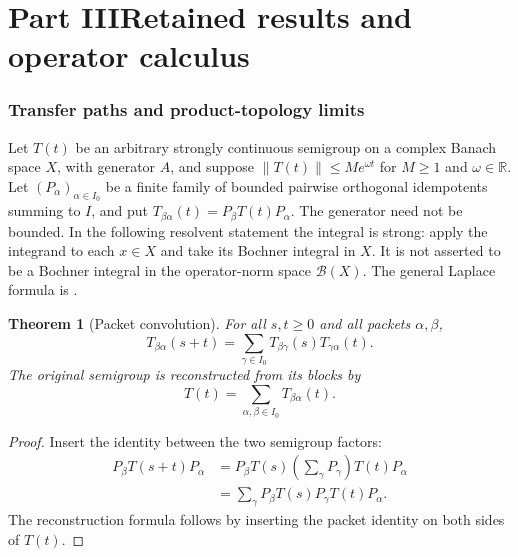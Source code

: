 \documentclass[11pt,a4paper]{article}
\newtheorem{theorem}{Theorem}[section]
\theoremstyle{definition}
\theoremstyle{remark}
\newcommand{\norm}[1]{\left\lVert#1\right\rVert}
\begin{document}
\part*{Part III\quad Retained results and operator calculus}
\setcounter{section}{0}\setcounter{figure}{0}\setcounter{table}{0}
\renewcommand{\thesection}{R\arabic{section}}
\renewcommand{\theHsection}{R.\arabic{section}}
\renewcommand{\thefigure}{R\arabic{figure}}
\renewcommand{\theHfigure}{R.\arabic{figure}}
\renewcommand{\thetable}{R\arabic{table}}
\renewcommand{\theHtable}{R.\arabic{table}}
\section{Transfer paths and product-topology limits}\label{earlier:section:01}
Let $T(t)$ be an arbitrary strongly continuous semigroup on a complex Banach space $X$, with generator $A$, and suppose $\norm{T(t)}\leq M e^{\omega t}$ for $M\geq1$ and $\omega\in\mathbb R$. Let $(P_\alpha)_{\alpha\in I_0}$ be a finite family of bounded pairwise orthogonal idempotents summing to $I$, and put $T_{\beta\alpha}(t)=P_\beta T(t)P_\alpha$. The generator need not be bounded. In the following resolvent statement the integral is strong: apply the integrand to each $x\in X$ and take its Bochner integral in $X$. It is not asserted to be a Bochner integral in the operator-norm space $\mathcal B(X)$. The general Laplace formula is \cite[Chapter II, Theorem 1.10]{EngelNagel2000}.
\begin{theorem}[Packet convolution]\label{earlier:record:001}\label{earlier:thm:packet_convolution}
For all \(s,t\geq0\) and all packets \(\alpha,\beta\),
\[
\boxed{
T_{\beta\alpha}(s+t)
=
\sum_{\gamma\in I_0}
T_{\beta\gamma}(s)T_{\gamma\alpha}(t).
}
\]
The original semigroup is reconstructed from its blocks by
\[
T(t)=\sum_{\alpha,\beta\in I_0}T_{\beta\alpha}(t).
\]
\end{theorem}

\begin{proof}
Insert the identity between the two semigroup factors:
\[
\begin{aligned}
P_\beta T(s+t)P_\alpha
&=P_\beta T(s)\left(\sum_\gamma P_\gamma\right)T(t)P_\alpha\\
&=\sum_\gamma
P_\beta T(s)P_\gamma T(t)P_\alpha.
\end{aligned}
\]
The reconstruction formula follows by inserting the packet identity on both sides of \(T(t)\).
\end{proof}
\end{document}
